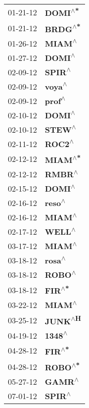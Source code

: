 \begin{supertabular}{p{0.08\textwidth}p{0.2\textwidth}}
 01-21-12 &   \textbf{DOMI\textsuperscript{$\wedge$*}} \\
 01-21-12 &   \textbf{BRDG\textsuperscript{$\wedge$*}} \\
 01-26-12 &    \textbf{MIAM\textsuperscript{$\wedge$}} \\
 01-27-12 &    \textbf{DOMI\textsuperscript{$\wedge$}} \\
 02-09-12 &    \textbf{SPIR\textsuperscript{$\wedge$}} \\
 02-09-12 &    \textbf{voya\textsuperscript{$\wedge$}} \\
 02-09-12 &    \textbf{prof\textsuperscript{$\wedge$}} \\
 02-10-12 &    \textbf{DOMI\textsuperscript{$\wedge$}} \\
 02-10-12 &    \textbf{STEW\textsuperscript{$\wedge$}} \\
 02-11-12 &    \textbf{ROC2\textsuperscript{$\wedge$}} \\
 02-12-12 &   \textbf{MIAM\textsuperscript{$\wedge$*}} \\
 02-12-12 &    \textbf{RMBR\textsuperscript{$\wedge$}} \\
 02-15-12 &    \textbf{DOMI\textsuperscript{$\wedge$}} \\
 02-16-12 &    \textbf{reso\textsuperscript{$\wedge$}} \\
 02-16-12 &    \textbf{MIAM\textsuperscript{$\wedge$}} \\
 02-17-12 &    \textbf{WELL\textsuperscript{$\wedge$}} \\
 03-17-12 &    \textbf{MIAM\textsuperscript{$\wedge$}} \\
 03-18-12 &    \textbf{rosa\textsuperscript{$\wedge$}} \\
 03-18-12 &    \textbf{ROBO\textsuperscript{$\wedge$}} \\
 03-18-12 &    \textbf{FIR\textsuperscript{$\wedge$*}} \\
 03-22-12 &    \textbf{MIAM\textsuperscript{$\wedge$}} \\
 03-25-12 &   \textbf{JUNK\textsuperscript{$\wedge$H}} \\
 04-19-12 &    \textbf{1348\textsuperscript{$\wedge$}} \\
 04-28-12 &    \textbf{FIR\textsuperscript{$\wedge$*}} \\
 04-28-12 &   \textbf{ROBO\textsuperscript{$\wedge$*}} \\
 05-27-12 &    \textbf{GAMR\textsuperscript{$\wedge$}} \\
 07-01-12 &    \textbf{SPIR\textsuperscript{$\wedge$}} \\

\end{supertabular}
